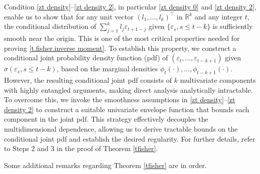 \documentclass[ejsv2]{imsart}
\theoremstyle{plain}
\theoremstyle{definition}
\theoremstyle{remark}
\newtheorem{remark}{Remark}[section]
\begin{document}
Condition
\eqref{zt density}--\eqref{zt density 2},
in particular 
\eqref{zt density 0}
and 
\eqref{zt density 2},
enable us
to show that for any unit vector $(l_1,\ldots, l_k)^{\top}$ in $\mathbb{R}^{k}$
and any integer $t$,
the conditional distribution of $\sum_{j=1}^{k}l_j\varepsilon_{t+1-j}$
given $\{\varepsilon_{s}, s\leq t-k\}$
is sufficiently smooth near the origin. This is one of the most critical properties needed for proving 
\eqref{t.fisher.inverse moment}.
To establish this property, we construct 
a conditional joint probability density function (pdf)
of $(\varepsilon_{t}, \ldots, \varepsilon_{t-k+1})$
given $\sigma(\varepsilon_{s}, s\leq t-k)$,
based on the marginal densities
$\phi_t(\cdot), \ldots, \phi_{t-k+1}(\cdot)$.
However, the resulting conditional joint pdf consists of 
$k$ multivariate components with 
highly entangled arguments, making direct analysis analytically intractable. To overcome this, we invoke the smoothness assumptions in
\eqref{zt density}--\eqref{zt density 2}
 to construct a suitable univariate envelope function that bounds each component in the joint pdf. This strategy effectively decouples the multidimensional dependence, allowing us to derive tractable bounds on the conditional joint pdf and establish the desired regularity.
 For further details, refer to Steps 2 and 3 in the proof of 
 Theorem \ref{tfisher}.

\vspace{0.3cm}
Some additional remarks regarding 
Theorem \ref{tfisher} are in order.
\end{document}
